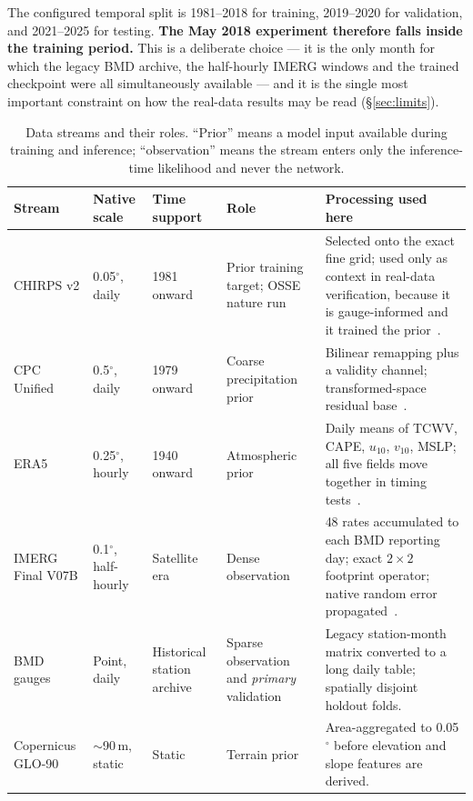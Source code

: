 \documentclass[10pt,twocolumn]{article}
\begin{document}
The configured temporal split is 1981--2018 for training, 2019--2020 for
validation, and 2021--2025 for testing. \textbf{The May 2018 experiment
therefore falls inside the training period.} This is a deliberate choice ---
it is the only month for which the legacy BMD archive, the half-hourly IMERG
windows and the trained checkpoint were all simultaneously available --- and
it is the single most important constraint on how the real-data results may be
read (\S\ref{sec:limits}).

\begin{table}[t]
\centering
\caption{Data streams and their roles. ``Prior'' means a model input available
during training and inference; ``observation'' means the stream enters only the
inference-time likelihood and never the network.}
\label{tab:data}
\small
\begin{tabular}{L{0.14\textwidth}L{0.11\textwidth}L{0.13\textwidth}L{0.14\textwidth}L{0.32\textwidth}}
\toprule
Stream & Native scale & Time support & Role & Processing used here \\
\midrule
CHIRPS v2 & 0.05$^\circ$, daily & 1981 onward & Prior training target; OSSE nature run & Selected onto the exact fine grid; used only as context in real-data verification, because it is gauge-informed and it trained the prior~\cite{funk2015}. \\
CPC Unified & 0.5$^\circ$, daily & 1979 onward & Coarse precipitation prior & Bilinear remapping plus a validity channel; transformed-space residual base~\cite{chen2008}. \\
ERA5 & 0.25$^\circ$, hourly & 1940 onward & Atmospheric prior & Daily means of TCWV, CAPE, $u_{10}$, $v_{10}$, MSLP; all five fields move together in timing tests~\cite{hersbach2020}. \\
IMERG Final V07B & 0.1$^\circ$, half-hourly & Satellite era & Dense observation & 48 rates accumulated to each BMD reporting day; exact $2\times2$ footprint operator; native random error propagated~\cite{huffman2020}. \\
BMD gauges & Point, daily & Historical station archive & Sparse observation and \emph{primary} validation & Legacy station-month matrix converted to a long daily table; spatially disjoint holdout folds. \\
Copernicus GLO-90 & $\sim$90\,m, static & Static & Terrain prior & Area-aggregated to 0.05$^\circ$ before elevation and slope features are derived. \\
\bottomrule
\end{tabular}
\end{table}
\end{document}
